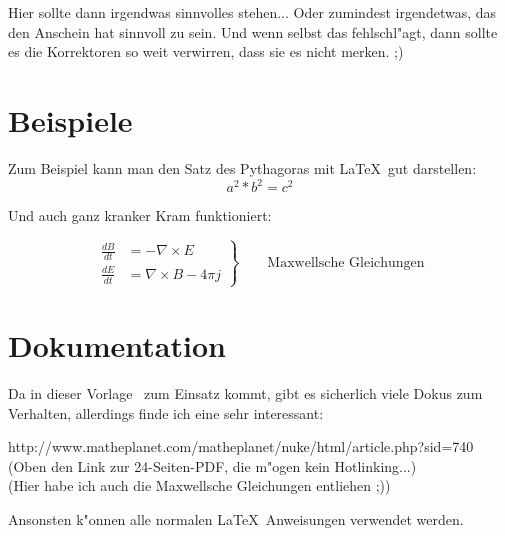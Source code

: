 \documentclass[10pt,a4paper]{article}
\begin{document}
\setlength{\parindent}{0mm}
\setlength{\parskip}{6pt }


\hfill


Hier sollte dann irgendwas sinnvolles stehen... Oder zumindest irgendetwas, das den Anschein hat sinnvoll zu sein. 
Und wenn selbst das fehlschl"agt, dann sollte es die Korrektoren so weit verwirren, dass sie es nicht merken. ;)

\section{Beispiele}

Zum Beispiel kann man den Satz des Pythagoras mit \LaTeX\ gut darstellen:
\begin{equation}
	a^2 * b^2 = c^2
\end{equation}

Und auch ganz kranker Kram funktioniert:

\begin{equation} \left. \begin{aligned} \frac{dB}{dt} & = -\nabla \times E \\ \frac{dE}{dt} & = \nabla \times B - 4 \pi j \end{aligned} \right\}\qquad \text{Maxwellsche Gleichungen} \end{equation}

\section{Dokumentation}

Da in dieser Vorlage \AmS\ zum Einsatz kommt, gibt es sicherlich viele Dokus zum Verhalten, allerdings finde ich eine sehr interessant:

http://www.matheplanet.com/matheplanet/nuke/html/article.php?sid=740 (Oben den Link zur 24-Seiten-PDF, die m"ogen kein Hotlinking...)\\\small{(Hier habe ich auch die Maxwellsche Gleichungen entliehen ;))}

Ansonsten k"onnen alle normalen \LaTeX\ Anweisungen verwendet werden.
\end{document}
